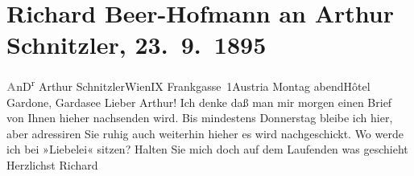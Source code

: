 

         \newcommand{\erwaehnteOrte}{Orte: Frankgasse, Gardone Riviera, Grand Hotel Gardone, IX., Alsergrund, Wien, Österreich}
         \newcommand{\erwaehnteWerke}{Werke: Liebelei. Schauspiel in drei Akten}
               \section[Richard Beer-Hofmann an Arthur Schnitzler, 23. 9. 1895]{ Richard Beer-Hofmann an Arthur Schnitzler,
               23. 9. 1895}\nopagebreak{}\rehead{ }\begin{ledgroupsized}[t]{13cm}\normalsize\beginnumbering \toendnotes[C]{\smallbreak\pagebreak[2]} 
\pstart{}{\pb}\textcolor{gray}{\textbf{A}}n\pend{}\pstart{}D\textsuperscript{r} Arthur Schnitzler\pend{}\pstart{}Wien\pend{}\pstart{}IX Frankgasse 1\pend{}\pstart{}Austria\pend{}{\bigskip}\pstart
           \raggedleft{}{\pb}\introOben{}Montag{ }abend\introOben{}{ }Hôtel Gardone, Gardasee\pend
           \pstart
           Lieber Arthur! Ich denke daß man mir morgen einen Brief von Ihnen
               hieher nachsenden wird. Bis mindestens Donnerstag bleibe ich hier, aber
               adressiren Sie ruhig auch weiterhin hieher es wird nachgeschickt. Wo werde ich bei
                  »Liebelei« sitzen? Halten Sie mich doch auf dem
               Laufenden was geschieht\pend
           \pstart Herzlichst \spacefill\mbox{Richard}\pend{}
         
         \endnumbering{}\end{ledgroupsized}  \newcommand{\dateiname}{L00491}\newcommand{\titel}{Richard Beer-Hofmann an Arthur Schnitzler, 23. 9. 1895}\newcommand{\editorInnen}{Martin Anton Müller und Gerd-Hermann Susen}
      